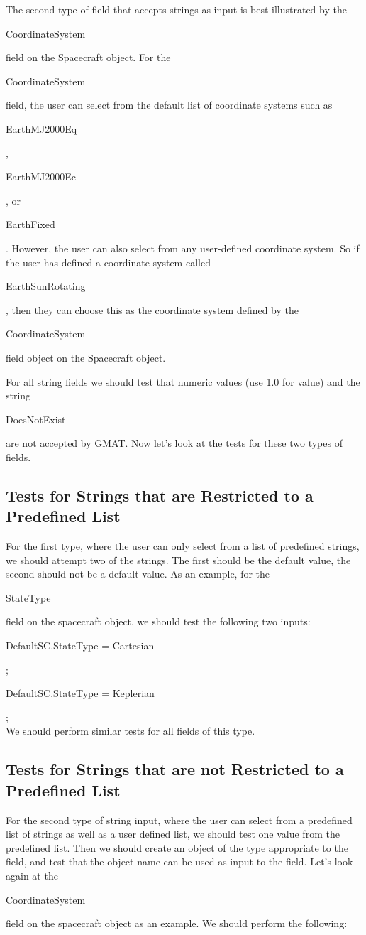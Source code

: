 \documentclass[10 pt]{book}
\newcommand{\st}[1]{\begin{ttfamily}#1\end{ttfamily}}
\begin{document}
The second type of field that accepts strings as input is best
illustrated by the \st{CoordinateSystem} field on the Spacecraft
object.  For the \st{CoordinateSystem} field, the user can select
from the default list of coordinate systems such as
\st{EarthMJ2000Eq}, \st{EarthMJ2000Ec}, or \st{EarthFixed}. However,
the user can also select from any user-defined coordinate system. So
if the user has defined a coordinate system called
\st{EarthSunRotating}, then they can choose this as the coordinate
system defined by the \st{CoordinateSystem} field object on the
Spacecraft object.

For all string fields we should test that numeric values (use 1.0
for value) and the string \st{DoesNotExist} are not accepted by
GMAT. Now let's look at the tests for these two types of fields.

\subsection{Tests for Strings that are Restricted to a Predefined
List}

 For the first type, where the user can only select from a list
of predefined strings, we should attempt two of the strings.  The
first should be the default value, the second should not be a
default value. As an example, for the \st{StateType} field on the
spacecraft object, we should test the following two inputs:\\

\noindent \st{DefaultSC.StateType = Cartesian};\\
\st{DefaultSC.StateType = Keplerian};\\

We should perform similar tests for all fields of this type.

\subsection{Tests for Strings that are not Restricted to a Predefined
List}

For the second type of string input, where the user can select from
a predefined list of strings as well as a user defined list, we
should test one value from the predefined list.  Then we should
create an object of the type appropriate to the field, and test that
the object name can be used as input to the field.  Let's look again
at the \st{CoordinateSystem} field on the spacecraft object as an
example.  We should perform the following:\\
\end{document}
